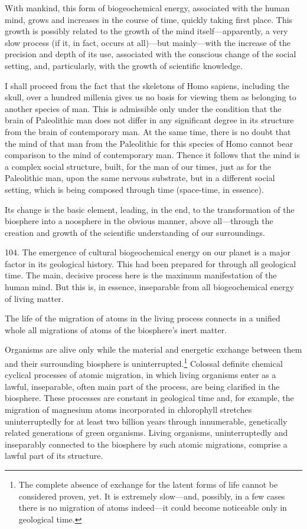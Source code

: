 With mankind, this form of biogeochemical energy, associated with the human
mind, grows and increases in the course of time, quickly taking first place.
This growth is possibly related to the growth of the mind itself---apparently,
a very slow process (if it, in fact, occurs at all)---but mainly---with the
increase of the precision and depth of its use, associated with the conscious
change of the social setting, and, particularly, with the growth of scientific
knowledge.

I shall proceed from the fact that the skeletons of Homo sapiens, including
the skull, over a hundred millenia gives us no basis for viewing them as
belonging to another species of man.  This is admissible only under the
condition that the brain of Paleolithic man does not differ in any significant
degree in its structure from the brain of contemporary man.  At the same time,
there is no doubt that the mind of that man from the Paleolithic for this
species of Homo cannot bear comparison to the mind of contemporary man.
Thence it follows that the mind is a complex social structure, built, for the
man of our times, just as for the Paleolithic man, upon the same nervous
substrate, but in a different social setting, which is being composed through
time (space-time, in essence).

Its change is the basic element, leading, in the end, to the transformation of
the biosphere into a noosphere in the obvious manner, above all---through the
creation and growth of the scientific understanding of our surroundings.


104. The emergence of cultural biogeochemical energy on our planet is a major
factor in its geological history.  This had been prepared for through all
geological time.  The main, decisive process here is the maximum manifestation
of the human mind.  But this is, in essence, inseparable from all
biogeochemical energy of living matter.

The life of the migration of atoms in the living process connects in a unified
whole all migrations of atoms of the biosphere's inert matter.

Organisms are alive only while the material and energetic exchange between
them and their surrounding biosphere is uninterrupted.\footnote{
	The complete absence of exchange for the latent forms of life cannot be
	considered proven, yet.  It is extremely slow---and, possibly, in a few
	cases there is no migration of atoms indeed---it could become
	noticeable only in geological time.
}  Colossal definite chemical cyclical processes of atomic migration, in which
living organisms enter as a lawful, inseparable, often main part of the
process, are being clarified in the biosphere.  These processes are constant in
geological time and, for example, the migration of magnesium atoms incorporated
in chlorophyll stretches uninterruptedly for at least two billion years through
innumerable, genetically related generations of green organisms.  Living
organisms, uninterruptedly and inseparably connected to the biosphere by such
atomic migrations, comprise a lawful part of its structure.

